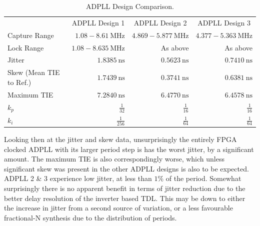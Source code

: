 \begin{table}[]
    \begin{center}
        \begin{tabular}{lrrr}
        \multicolumn{1}{c}{}          & \multicolumn{1}{c}{ADPLL Design 1}  & \multicolumn{1}{c}{ADPLL Design 2} & \multicolumn{1}{c}{ADPLL Design 3} \\ \cline{2-4}       
        Capture Range                 & $1.08-8.61~\si{\mega\hertz}$       & $4.869-5.877~\si{\mega\hertz}$    & $4.377-5.363~\si{\mega\hertz}$       \T\\
        Lock Range                    & $1.08-8.635~\si{\mega\hertz}$      & As above                           & As above                            \\
        Jitter                        & $1.8385~\si{\nano\second}$         & $0.5623~\si{\nano\second}$         & $0.7410~\si{\nano\second}$          \\
        Skew (Mean \acs{TIE} to Ref.) & $1.7439~\si{\nano\second}$         & $0.3741~\si{\nano\second}$         & $0.6381~\si{\nano\second}$          \\
        Maximum \acs{TIE}             & $7.2840~\si{\nano\second}$         & $6.4770~\si{\nano\second}$         & $6.4578~\si{\nano\second}$          \\
        $k_p$                         & $\frac{1}{32}$                     & $\frac{1}{16}$                     & $\frac{1}{16}$                      \\
        $k_i$                         & $\frac{1}{256}$                    & $\frac{1}{64}$                     & $\frac{1}{64}$  
        \end{tabular}
    \end{center}
    \caption[\ac{ADPLL} Design Comparison]{\ac{ADPLL} Design Comparison.}
    \label{table:characterisation}
\end{table}

Looking then at the jitter and skew data, unsurprisingly the entirely \ac{FPGA} clocked \ac{ADPLL} with its larger period step is has the worst jitter, by a significant amount. The maximum \ac{TIE} is also correspondingly worse, which unless significant skew was present in the other \ac{ADPLL} designs is also to be expected. \ac{ADPLL} 2 \& 3 experience low jitter, at less than $1\%$ of the period. Somewhat surprisingly there is no apparent benefit in terms of jitter reduction due to the better delay resolution of the inverter based \ac{TDL}. This may be down to either the increase in jitter from a second source of variation, or a less favourable fractional-N synthesis due to the distribution of periods.

